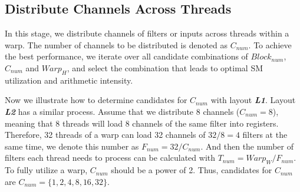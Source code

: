 \subsection{Distribute Channels Across Threads}
In this stage, we distribute channels of filters or inputs across threads within a warp.
The number of channels to be distributed is denoted as $C_{num}$.
To achieve the best performance, we iterate over all candidate combinations of $Block_{num}$, $C_{num}$ and $Warp_H$, and select the combination that leads to optimal SM utilization and arithmetic intensity.

Now we illustrate how to determine candidates for $C_{num}$ with layout \textbf{\emph{L1}}.
Layout \textbf{\emph{L2}} has a similar process.
Assume that we distribute 8 channels ($C_{num}=8$), meaning that 8 threads will load 8 channels of the same filter into registers.
Therefore, 32 threads of a warp can load 32 channels of $32/8=4$ filters at the same time, we denote this number as $F_{num}=32/C_{num}$.
And then the number of filters each thread needs to process can be calculated with $T_{num}=Warp_W/F_{num}$.
To fully utilize a warp, $C_{num}$ should be a power of 2.
Thus, candidates for $C_{num}$ are $C_{num}=\{1,2,4,8,16,32\}$.




